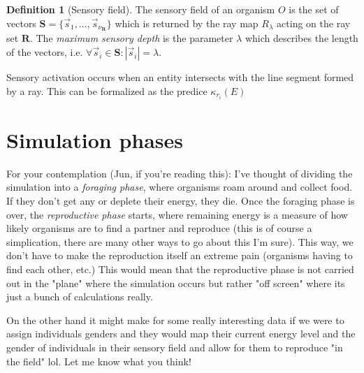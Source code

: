 \documentclass[a4paper, 12pt]{report}
\theoremstyle{definition}
\newtheorem{definition}{Definition}[chapter]
\begin{document}
\begin{definition}[Sensory field]
    The sensory field of an organism $O$ is the set of vectors $\mathbf S = \{\vec{s}_1, \ldots, \vec{s}_{\nu_{\mathbf R}}\}$ which is returned by the ray map $R_\lambda$ acting on the
    ray set $\mathbf R$. The \emph{maximum sensory depth} is the parameter $\lambda$ which describes the length of the vectors, i.e. $\forall \vec{s}_i \in \mathbf S: |\vec{s}_i| = \lambda$.
\end{definition}

Sensory activation occurs when an entity intersects with the line segment formed by a ray. This can be formalized as the predice $\kappa_{r_i}(E)$

\section{Simulation phases}
For your contemplation (Jun, if you're reading this): I've thought of dividing the simulation into a \emph{foraging phase}, where organisms roam around and collect food.
If they don't get any or deplete their energy, they die. Once the foraging phase is over, the \emph{reproductive phase} starts, where remaining energy is a measure of how
likely organisms are to find a partner and reproduce (this is of course a simplication, there are many other ways to go about this I'm sure). This way, we don't have to make
the reproduction itself an extreme pain (organisms having to find each other, etc.) This would mean that the reproductive phase is not carried out in the "plane" where the simulation
occurs but rather "off screen" where its just a bunch of calculations really.
\par On the other hand it might make for some really interesting data if we were to assign individuals genders and they would map their current energy level and the gender of individuals
in their sensory field and allow for them to reproduce "in the field" lol. Let me know what you think!
\end{document}
